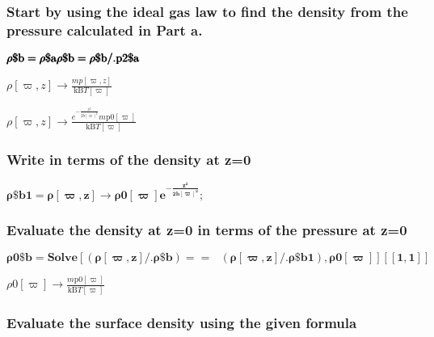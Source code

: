\documentclass{article}
\begin{document}
\subsubsection*{Start by using the ideal gas law to find the density from the pressure calculated in Part a.}

\begin{doublespace}
\noindent\(\pmb{\text{$\rho \$$b} = \text{$\rho \$$a} }\\
\pmb{\text{$\rho \$$b} = \text{$\rho \$$b} \text{/.} \text{p2$\$$a} }\)
\end{doublespace}

\begin{doublespace}
\noindent\(\rho [\varpi ,z]\to \frac{m p[\varpi ,z]}{\text{kB} T[\varpi ]}\)
\end{doublespace}

\begin{doublespace}
\noindent\(\rho [\varpi ,z]\to \frac{e^{-\frac{z^2}{2 h[\varpi ]^2}} m \text{p0}[\varpi ]}{\text{kB} T[\varpi ]}\)
\end{doublespace}

\subsubsection*{Write in terms of the density at z=0}

\begin{doublespace}
\noindent\(\pmb{\text{$\rho \$$b1} = \rho [\varpi ,z]\to \text{$\rho $0}[\varpi ]e^{-\frac{z^2}{2 h[\varpi ]^2}};}\)
\end{doublespace}

\subsubsection*{Evaluate the density at z=0 in terms of the pressure at z=0}

\begin{doublespace}
\noindent\(\pmb{\text{$\rho $0$\$$b} = \text{Solve}[ (\rho [\varpi ,z] \text{/.} \text{$\rho \$$b}) ==\text{  }(\rho [\varpi ,z] \text{/.} \text{$\rho
\$$b1}), \text{$\rho $0}[\varpi ]][[1,1]]}\)
\end{doublespace}

\begin{doublespace}
\noindent\(\text{$\rho $0}[\varpi ]\to \frac{m \text{p0}[\varpi ]}{\text{kB} T[\varpi ]}\)
\end{doublespace}

\subsubsection*{Evaluate the surface density using the given formula}
\end{document}
